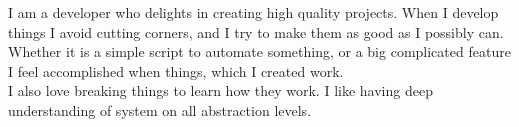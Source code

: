 \documentclass[9pt]{developercv} %
\begin{document}

\begin{minipage}[t]{0.46\textwidth} %
	\vspace{-\baselineskip} %

	I am a developer who delights in creating high quality projects.
	When I develop things I avoid cutting corners, and I try to make them as good as I possibly can. \\
	Whether it is a simple script to automate something, or a big complicated feature
	I feel accomplished when things, which I created work.\\
	I also love breaking things to learn how they work.
	I like having deep understanding of system on all abstraction levels.


\end{minipage}
\hfill %
\begin{minipage}[t]{0.5\textwidth} %
	\vspace{-\baselineskip} %
	\begin{barchart}{5.5}
	\end{barchart}
\end{minipage}

\begin{center}
\end{center}


\end{document}
